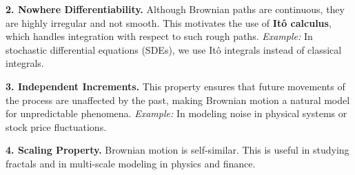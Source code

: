 \textbf{2. Nowhere Differentiability.}  
Although Brownian paths are continuous, they are highly irregular and not smooth. This motivates the use of \textbf{Itô calculus}, which handles integration with respect to such rough paths.  
\textit{Example:} In stochastic differential equations (SDEs), we use Itô integrals instead of classical integrals.

\textbf{3. Independent Increments.}  
This property ensures that future movements of the process are unaffected by the past, making Brownian motion a natural model for unpredictable phenomena.  
\textit{Example:} In modeling noise in physical systems or stock price fluctuations.

\textbf{4. Scaling Property.}  
Brownian motion is self-similar. This is useful in studying fractals and in multi-scale modeling in physics and finance.